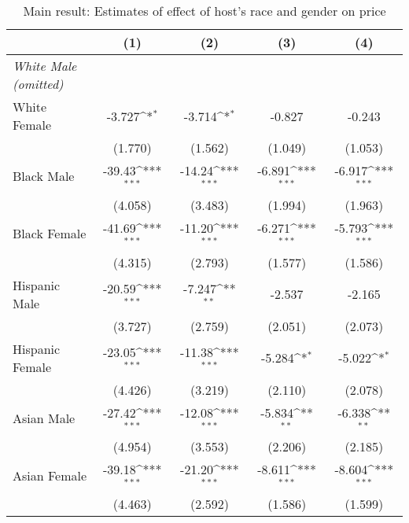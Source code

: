 {
\def\sym#1{\ifmmode^{#1}\else\(^{#1}\)\fi}
\begin{longtable}{l*{4}{c}}
\caption{Main result: Estimates of effect of host's race and gender on price}\\
\hline\hline\endfirsthead\hline\endhead\hline\endfoot\endlastfoot
                    &\multicolumn{1}{c}{(1)}&\multicolumn{1}{c}{(2)}&\multicolumn{1}{c}{(3)}&\multicolumn{1}{c}{(4)}\\
\hline
\textit{White Male (omitted)}  \\

White Female        &      -3.727\sym{*}  &      -3.714\sym{*}  &      -0.827         &      -0.243         \\
                    &     (1.770)         &     (1.562)         &     (1.049)         &     (1.053)         \\
[1em]
Black Male          &      -39.43\sym{***}&      -14.24\sym{***}&      -6.891\sym{***}&      -6.917\sym{***}\\
                    &     (4.058)         &     (3.483)         &     (1.994)         &     (1.963)         \\
[1em]
Black Female        &      -41.69\sym{***}&      -11.20\sym{***}&      -6.271\sym{***}&      -5.793\sym{***}\\
                    &     (4.315)         &     (2.793)         &     (1.577)         &     (1.586)         \\
[1em]
Hispanic Male       &      -20.59\sym{***}&      -7.247\sym{**} &      -2.537         &      -2.165         \\
                    &     (3.727)         &     (2.759)         &     (2.051)         &     (2.073)         \\
[1em]
Hispanic Female     &      -23.05\sym{***}&      -11.38\sym{***}&      -5.284\sym{*}  &      -5.022\sym{*}  \\
                    &     (4.426)         &     (3.219)         &     (2.110)         &     (2.078)         \\
[1em]
Asian Male          &      -27.42\sym{***}&      -12.08\sym{***}&      -5.834\sym{**} &      -6.338\sym{**} \\
                    &     (4.954)         &     (3.553)         &     (2.206)         &     (2.185)         \\
[1em]
Asian Female        &      -39.18\sym{***}&      -21.20\sym{***}&      -8.611\sym{***}&      -8.604\sym{***}\\
                    &     (4.463)         &     (2.592)         &     (1.586)         &     (1.599)         \\

\end{longtable}}
